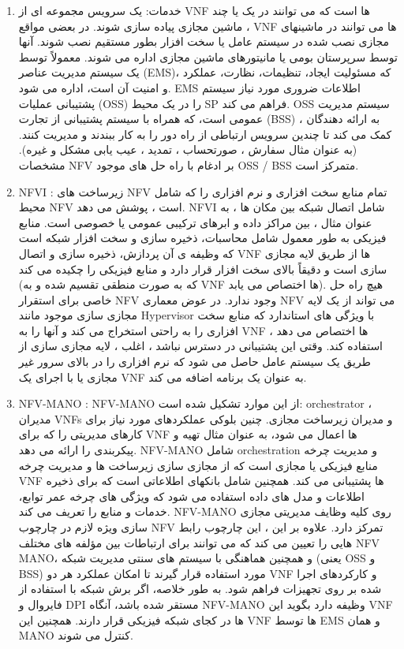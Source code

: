 \begin{enumerate}
\item 
خدمات: یک سرویس مجموعه ای از VNF ها است که می توانند در یک یا چند ماشین مجازی پیاده سازی شوند.
در بعضی مواقع ، VNF ها می توانند در ماشینهای مجازی نصب شده در سیستم عامل یا سخت افزار بطور مستقیم نصب شوند. آنها توسط سرپرستان بومی یا مانیتورهای ماشین مجازی اداره می شوند.
معمولاً توسط یک سیستم مدیریت عناصر  (EMS)،
 که مسئولیت ایجاد، تنظیمات، نظارت، عملکرد و امنیت آن است، اداره می شود.
 EMS 
 اطلاعات ضروری مورد نیاز سیستم پشتیبانی عملیات (OSS) را در یک محیط SP فراهم می کند.
 OSS
  سیستم مدیریت عمومی است، که  همراه با سیستم پشتیبانی از تجارت 
  (BSS)
  ، به ارائه دهندگان کمک می کند تا چندین سرویس ارتباطی از راه دور را به کار ببندند و مدیریت کنند.
  (به عنوان مثال سفارش ، صورتحساب ، تمدید ، عیب یابی مشکل و غیره).
مشخصات NFV بر ادغام با راه حل های موجود OSS / BSS متمرکز است.
\item NFVI
:
زیرساخت های NFV تمام منابع سخت افزاری و نرم افزاری را که شامل محیط NFV است ، پوشش می دهد.
NFVI شامل اتصال شبکه بین مکان ها ، به عنوان مثال ، بین
مراکز داده و ابرهای ترکیبی عمومی یا خصوصی است.
منابع فیزیکی به طور معمول شامل محاسبات، ذخیره سازی و سخت افزار شبکه است که وظیفه ی آن پردازش، ذخیره سازی و اتصال VNF ها از طریق لایه مجازی سازی است و دقیقاً بالای سخت افزار قرار دارد و منابع فیزیکی را چکیده می کند (که به صورت منطقی تقسیم شده و به VNF ها اختصاص می یابد).
هیچ راه حل خاصی برای استقرار NFV وجود ندارد. در عوض معماری NFV می تواند از یک لایه مجازی سازی موجود مانند Hypervisor با ویژگی های استاندارد که منابع سخت افزاری را به راحتی استخراج می کند و آنها را به VNF ها اختصاص می دهد ، استفاده کند.
وقتی این پشتیبانی در دسترس نباشد ، اغلب ، لایه مجازی سازی از طریق یک سیستم عامل حاصل می شود که نرم افزاری را در بالای سرور غیر مجازی یا با اجرای یک VNF به عنوان یک برنامه اضافه می کند.
\item NFV-MANO
:
NFV-MANO
 از این موارد تشکیل شده است:
 orchestrator
 ،
 مدیران VNFs و مدیران زیرساخت مجازی.
 چنین بلوکی عملکردهای مورد نیاز برای کارهای مدیریتی را که برای VNF ها اعمال می شود، به عنوان مثال تهیه و پیکربندی را  ارائه می دهد. 
 NFV-MANO شامل orchestration و مدیریت چرخه منابع فیزیکی یا مجازی است که از مجازی سازی زیرساخت ها و مدیریت چرخه VNF ها پشتیبانی می کند.
 همچنین شامل بانکهای اطلاعاتی است که برای ذخیره اطلاعات و مدل های داده استفاده می شود که ویژگی های چرخه عمر توابع، خدمات و منابع را تعریف می کند.
 NFV-MANO روی کلیه وظایف مدیریتی مجازی سازی ویژه لازم در چارچوب NFV تمرکز دارد.
 علاوه بر این ، این چارچوب رابط هایی را تعیین می کند که می توانند برای ارتباطات بین مؤلفه های مختلف
  NFV MANO، 
 و همچنین هماهنگی با سیستم های سنتی مدیریت شبکه (یعنی OSS و BSS) مورد استفاده قرار گیرند تا امکان عملکرد هر دو VNF و کارکردهای اجرا شده بر روی تجهیزات فراهم شود.
 به طور خلاصه، اگر برش شبکه با استفاده از فایروال و DPI مستقر شده باشد، آنگاه NFV-MANO وظیفه دارد بگوید این VNF ها در کجای شبکه فیزیکی قرار دارند. همچنین این VNF ها توسط EMS و همان MANO کنترل می شوند.
\end{enumerate}
